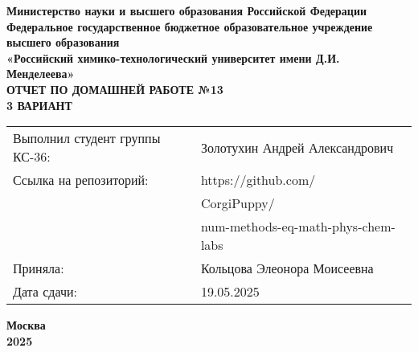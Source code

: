 \documentclass[12pt, a4paper]{report}
\begin{document}
	\begin{titlepage}
		\begin{center}
			\large \textbf{Министерство науки и высшего образования Российской Федерации} \\
			\large \textbf{Федеральное государственное бюджетное образовательное учреждение высшего образования} \\
			\large \textbf{«Российский химико-технологический университет имени Д.И. Менделеева»} \\

			\vspace*{4cm}
			\LARGE \textbf{ОТЧЕТ ПО ДОМАШНЕЙ РАБОТЕ №13} \\
			\Large \textbf{3 ВАРИАНТ}

			\vspace*{3cm}
			\begin{flushright}
				\Large
				\begin{tabular}{>{\raggedleft\arraybackslash}p{9cm} p{10cm}}
					Выполнил студент группы КС-36: & Золотухин Андрей Александрович \\
					Ссылка на репозиторий: & https://github.com/ \\
					& CorgiPuppy/ \\
					& num-methods-eq-math-phys-chem-labs \\
					Приняла: & Кольцова Элеонора Моисеевна \\
					Дата сдачи: & 19.05.2025 \\
				\end{tabular}
			\end{flushright}

			\vspace*{6cm}
			\Large \textbf{Москва \\ 2025}
		\end{center}
	\end{titlepage}

	\tableofcontents
	\thispagestyle{empty}
	\newpage

\end{document}
